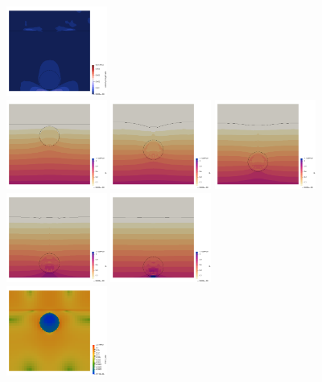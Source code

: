 \begin{center}
\includegraphics[width=3.3cm]{images/stokes_sphere_fs2D/harm_6_1/vel0200}\\
\includegraphics[width=3.3cm]{images/stokes_sphere_fs2D/harm_6_1/p0000}
\includegraphics[width=3.3cm]{images/stokes_sphere_fs2D/harm_6_1/p0050}
\includegraphics[width=3.3cm]{images/stokes_sphere_fs2D/harm_6_1/p0100}
\includegraphics[width=3.3cm]{images/stokes_sphere_fs2D/harm_6_1/p0150}
\includegraphics[width=3.3cm]{images/stokes_sphere_fs2D/harm_6_1/p0200}\\
\includegraphics[width=3.3cm]{images/stokes_sphere_fs2D/harm_6_1/sr0000}

\end{center}
